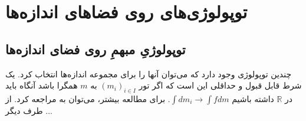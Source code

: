 \chapter{‌توپولوژی‌های روی فضاهای اندازه‌ها}
\thispagestyle{empty}
\section{ توپولوژیِ مبهمِ روی فضای اندازه‌ها}
چندین توپولوژی وجود دارد که می‌توان آنها را برای مجموعه اندازه‌ها انتخاب کرد. یک شرط قابل قبول و حداقلی این است که  اگر  تور
 $ (m_{i})_{i\in I} $
به 
$ m $
همگرا باشد آنگاه  باید در 
$\mathbb{R}  $
داشته باشیم 
$\int dm_{i}\to \int fdm  $.
برای مطالعه بیشتر، می‌توان به \cite{mainarticle} مراجعه کرد. از طرف دیگر ...
